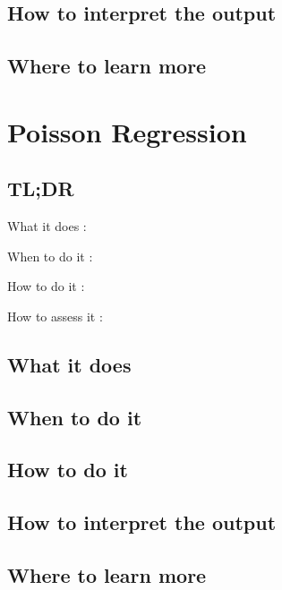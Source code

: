 \documentclass[
]{book}
\begin{document}
\hypertarget{how-to-interpret-the-output-7}{%
\section{How to interpret the output}\label{how-to-interpret-the-output-7}}

\hypertarget{where-to-learn-more-7}{%
\section{Where to learn more}\label{where-to-learn-more-7}}

\hypertarget{poisson-regression}{%
\chapter{Poisson Regression}\label{poisson-regression}}

\hypertarget{tldr-8}{%
\section{TL;DR}\label{tldr-8}}

What it does
:

When to do it
:

How to do it
:

How to assess it
:

\hypertarget{what-it-does-8}{%
\section{What it does}\label{what-it-does-8}}

\hypertarget{when-to-do-it-8}{%
\section{When to do it}\label{when-to-do-it-8}}

\hypertarget{how-to-do-it-8}{%
\section{How to do it}\label{how-to-do-it-8}}

\hypertarget{how-to-interpret-the-output-8}{%
\section{How to interpret the output}\label{how-to-interpret-the-output-8}}

\hypertarget{where-to-learn-more-8}{%
\section{Where to learn more}\label{where-to-learn-more-8}}
\end{document}
